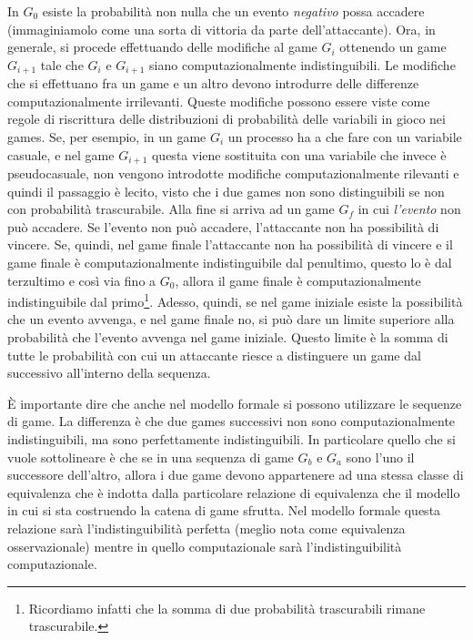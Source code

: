 \documentclass[a4paper,openright,twoside,12pt]{report}
\begin{document}
In $G_0$ esiste la probabilit\`a non nulla che un evento \emph{negativo} possa accadere (immaginiamolo come una sorta di vittoria da parte dell'attaccante).
Ora, in generale, si procede effettuando delle modifiche al game $G_i$ ottenendo un game $G_{i+1}$ 
tale che $G_i$ e $G_{i+1}$ siano computazionalmente indistinguibili. Le modifiche che si effettuano fra un game e un altro devono introdurre delle differenze computazionalmente irrilevanti.
Queste modifiche possono essere viste come regole di riscrittura delle distribuzioni di probabilit\`a delle variabili in gioco nei games.
Se, per esempio, in un game $G_i$ un processo ha a che fare con un variabile casuale, e nel game $G_{i+1}$ questa viene sostituita con una variabile che invece \`e pseudocasuale, non vengono introdotte
modifiche computazionalmente rilevanti e quindi il passaggio \`e lecito, visto che i due games non sono distinguibili se non con probabilit\`a trascurabile.
Alla fine si arriva ad un game $G_f$ in cui \emph{l'evento} non pu\`o accadere. Se l'evento non pu\`o accadere, l'attaccante non ha possibilit\`a di vincere. 
Se, quindi, nel game finale l'attaccante non ha possibilit\`a di vincere e il game finale
\`e computazionalmente indistinguibile dal penultimo, questo lo \`e dal terzultimo e cos\`i via fino a $G_0$, allora
il game finale \`e computazionalmente indistinguibile dal primo\footnote{Ricordiamo infatti che la somma di due probabilit\`a trascurabili rimane trascurabile.}. 
Adesso, quindi, se nel game iniziale esiste la possibilit\`a che un evento avvenga, e nel game finale no,
si pu\`o dare un limite superiore alla probabilit\`a che l'evento avvenga nel game iniziale. Questo limite \`e la somma di tutte le probabilit\`a con cui un attaccante riesce a distinguere un game dal successivo all'interno della sequenza.

\`E importante dire che anche nel modello formale si possono utilizzare le sequenze di game. La differenza \`e che due games successivi non sono computazionalmente indistinguibili, 
ma sono perfettamente indistinguibili. In particolare quello che si vuole sottolineare \`e che se in una sequenza di game $G_b$ e $G_a$ sono l'uno il successore dell'altro, 
allora i due game 
devono appartenere ad una stessa classe di equivalenza che \`e indotta dalla particolare relazione di equivalenza che il modello in cui si sta costruendo la catena di game sfrutta.
Nel modello formale questa relazione sar\`a l'indistinguibilit\`a perfetta (meglio nota come equivalenza osservazionale) mentre in quello computazionale sar\`a 
l'indistinguibilit\`a computazionale.
\end{document}
